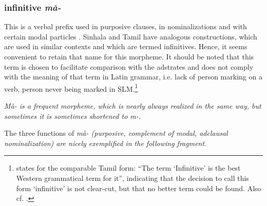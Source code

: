  




\subsubsection{infinitive \em mà-\em}\label{sec:morph:ma-}
This is a verbal prefix used  in purposive clauses, in  nominalizations and with certain modal particles \citep[cf.][139f,144f]{Slomanson2006cll}. Sinhala and Tamil have analogous constructions, which are used in   similar contexts and which are termed infinitives. Hence, it seems convenient to retain that name for this morpheme. It should be noted that this term is chosen to facilitate comparison with the adstrates and does not comply with the meaning of that term in Latin grammar, i.e. lack of person marking on a verb, person never being marked in SLM.\footnote{\citet[196]{Arden1934} states for the comparable Tamil form: ``The term `Infinitive' is the best Western grammatical term for it'', indicating that the decision to call this form `infinitive' is not clear-cut, but that no better term could be found. Also cf. \citet[106]{Beythan1943}. }

\em Mà- \em is a frequent morpheme, which is nearly always realized in the same way, but sometimes it is sometimes shortened to \em m-\em.

The three functions of \em mà- \em (purposive, complement of modal, adclausal nominalization) are nicely exemplified in the following fragment.


